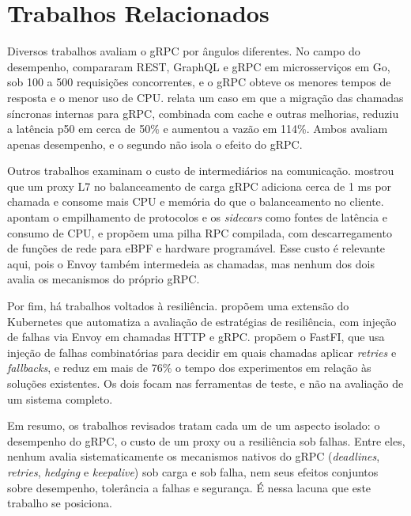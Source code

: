 \chapter{Trabalhos Relacionados}
\label{cap:trabalhos:relacionados}

Diversos trabalhos avaliam o gRPC por ângulos diferentes. No campo do desempenho,
 compararam REST, GraphQL e gRPC em microsserviços em Go,
sob 100 a 500 requisições concorrentes, e o gRPC obteve os menores tempos de resposta e o menor uso
de CPU.  relata um caso em que a migração das chamadas síncronas
internas para gRPC, combinada com cache e outras melhorias, reduziu a latência p50 em
cerca de 50\% e aumentou a vazão em 114\%. Ambos avaliam apenas desempenho, e o segundo não isola o
efeito do gRPC.

Outros trabalhos examinam o custo de intermediários na comunicação.
 mostrou que um proxy L7 no balanceamento de
carga gRPC adiciona cerca de 1 ms por chamada e consome mais CPU e memória do que o balanceamento
no cliente.  apontam o empilhamento de protocolos e os
\textit{sidecars} como fontes de latência e consumo de CPU, e propõem uma pilha RPC compilada, com
descarregamento de funções de rede para eBPF e hardware programável. Esse custo é relevante aqui,
pois o Envoy também intermedeia as chamadas, mas nenhum dos dois avalia os mecanismos do próprio gRPC.

Por fim, há trabalhos voltados à resiliência.  propõem
uma extensão do Kubernetes que automatiza a avaliação de estratégias de resiliência, com injeção de
falhas via Envoy em chamadas HTTP e gRPC.  propõem o FastFI, que
usa injeção de falhas combinatórias para decidir em quais chamadas aplicar \textit{retries} e
\textit{fallbacks}, e reduz em mais de 76\% o tempo dos experimentos em relação às soluções
existentes. Os dois focam nas ferramentas de teste, e não na avaliação de um sistema completo.

Em resumo, os trabalhos revisados tratam cada um de um aspecto isolado: o desempenho do gRPC, o
custo de um proxy ou a resiliência sob falhas. Entre eles, nenhum avalia sistematicamente
os mecanismos nativos do gRPC (\textit{deadlines}, \textit{retries}, \textit{hedging} e
\textit{keepalive}) sob carga e sob falha, nem seus efeitos conjuntos sobre desempenho, tolerância
a falhas e segurança. É nessa lacuna que este trabalho se posiciona.


